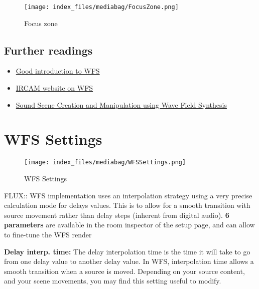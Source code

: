 \documentclass[
  letterpaper,
  DIV=11,
  numbers=noendperiod]{scrreport}
\begin{document}
\begin{figure}

{\centering \texttt{[image: index\_files/mediabag/FocusZone.png]}

}

\caption{Focus zone}

\end{figure}

\hypertarget{further-readings}{%
\subsection{Further readings}\label{further-readings}}

\begin{itemize}
\item
  \href{http://www.syntheticwave.de/Wavefieldsynthesis.htm}{Good
  introduction to WFS}
\item
  \href{http://recherche.ircam.fr/equipes/salles/WFS_WEBSITE/Index_wfs_site.htm}{IRCAM
  website on WFS}
\item
  \href{http://recherche.ircam.fr/equipes/salles/WFS_WEBSITE/Documents/WFS_overview.pdf}{Sound
  Scene Creation and Manipulation using Wave Field Synthesis}
\end{itemize}

\hypertarget{wfs-settings}{%
\section{WFS Settings}\label{wfs-settings}}

\begin{figure}

{\centering \texttt{[image: index\_files/mediabag/WFSSettings.png]}

}

\caption{WFS Settings}

\end{figure}

FLUX:: WFS implementation uses an interpolation strategy using a very
precise calculation mode for delays values. This is to allow for a
smooth transition with source movement rather than delay steps (inherent
from digital audio). \textbf{6 parameters} are available in the room
inspector of the setup page, and can allow to fine-tune the WFS render

\textbf{Delay interp. time:} The delay interpolation time is the time it
will take to go from one delay value to another delay value. In WFS,
interpolation time allows a smooth transition when a source is moved.
Depending on your source content, and your scene movements, you may find
this setting useful to modify.
\end{document}
